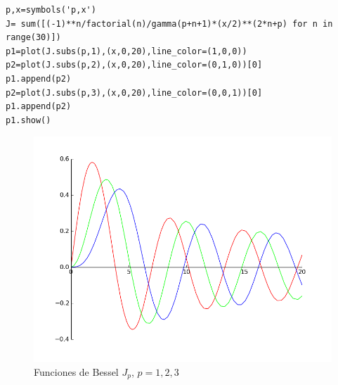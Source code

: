 \begin{lstlisting}
p,x=symbols('p,x')
J= sum([(-1)**n/factorial(n)/gamma(p+n+1)*(x/2)**(2*n+p) for n in range(30)])
p1=plot(J.subs(p,1),(x,0,20),line_color=(1,0,0))
p2=plot(J.subs(p,2),(x,0,20),line_color=(0,1,0))[0]
p1.append(p2)
p2=plot(J.subs(p,3),(x,0,20),line_color=(0,0,1))[0]
p1.append(p2)
p1.show()
\end{lstlisting}
\begin{figure}[h]
\begin{center}
\includegraphics[scale=.5]{imagenes/bessel.png}
\end{center}

\caption{Funciones de Bessel $J_p$, $p=1,2,3$}\label{fig:bessel}

\end{figure}





